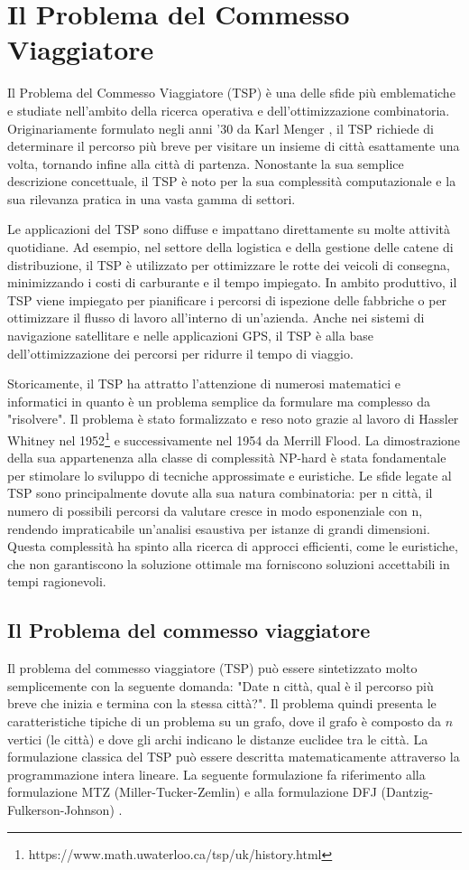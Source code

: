 \documentclass[a4paper,12pt]{report}
\begin{document}
\afterpreface
% 
% 
\chapter{Il Problema del Commesso Viaggiatore}
Il Problema del Commesso Viaggiatore (TSP) è una delle sfide più emblematiche e studiate nell'ambito della ricerca operativa e dell'ottimizzazione combinatoria. Originariamente formulato negli anni '30 da Karl Menger \cite{Menger}, il TSP richiede di determinare il percorso più breve per visitare un insieme di città esattamente una volta, tornando infine alla città di partenza. Nonostante la sua semplice descrizione concettuale, il TSP è noto per la sua complessità computazionale e la sua rilevanza pratica in una vasta gamma di settori.

Le applicazioni del TSP sono diffuse e impattano direttamente su molte attività quotidiane. Ad esempio, nel settore della logistica e della gestione delle catene di distribuzione, il TSP è utilizzato per ottimizzare le rotte dei veicoli di consegna, minimizzando i costi di carburante e il tempo impiegato. In ambito produttivo, il TSP viene impiegato per pianificare i percorsi di ispezione delle fabbriche o per ottimizzare il flusso di lavoro all'interno di un'azienda. Anche nei sistemi di navigazione satellitare e nelle applicazioni GPS, il TSP è alla base dell'ottimizzazione dei percorsi per ridurre il tempo di viaggio.

Storicamente, il TSP ha attratto l'attenzione di numerosi matematici e informatici in quanto è un problema semplice da formulare ma complesso da "risolvere". Il problema è stato formalizzato e reso noto grazie al lavoro di Hassler Whitney nel 1952\footnote[1]{https://www.math.uwaterloo.ca/tsp/uk/history.html} e successivamente nel 1954 da Merrill Flood. La dimostrazione della sua appartenenza alla classe di complessità NP-hard è stata fondamentale per stimolare lo sviluppo di tecniche approssimate e euristiche. Le sfide legate al TSP sono principalmente dovute alla sua natura combinatoria: per n città, il numero di possibili percorsi da valutare cresce in modo esponenziale con n, rendendo impraticabile un'analisi esaustiva per istanze di grandi dimensioni. Questa complessità ha spinto alla ricerca di approcci efficienti, come le euristiche, che non garantiscono la soluzione ottimale ma forniscono soluzioni accettabili in tempi ragionevoli.

\section{Il Problema del commesso viaggiatore}
Il problema del commesso viaggiatore (TSP) può essere sintetizzato molto semplicemente con la seguente domanda: "Date n città, qual è il percorso più breve che inizia e termina con la stessa città?". Il problema quindi presenta le caratteristiche tipiche di un problema su un grafo, dove il grafo è composto da $n$ vertici (le città) e dove gli archi indicano le distanze euclidee tra le città. La formulazione classica del TSP può essere descritta matematicamente attraverso la programmazione intera lineare. La seguente formulazione fa riferimento alla formulazione MTZ (Miller-Tucker-Zemlin) e alla formulazione DFJ (Dantzig-Fulkerson-Johnson) \cite{TSP formulation}.
\end{document}
